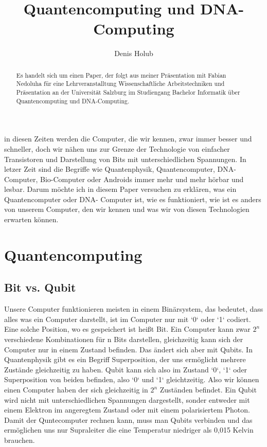 \documentclass{IEEEcsmag}
\begin{document}

\title{Quantencomputing und DNA-Computing}

\author{Denis Holub}



\begin{abstract}
Es handelt sich um einen Paper, der folgt aus meiner Präsentation mit Fabian Nedoluha für eine Lehrveranstalltung Wissenschaftliche Arbeitstechniken und Präsentation an der Universität Salzburg im Studiengang Bachelor Informatik über Quantencomputing und DNA-Computing. 
\end{abstract}

\maketitle


in diesen Zeiten werden die Computer, die wir kennen, zwar immer besser und schneller, doch wir nähen uns zur Grenze der Technologie von einfacher Transistoren und Darstellung von Bits mit unterschiedlichen Spannungen. In letzer Zeit sind die Begriffe wie Quantenphysik, Quantencomputer, DNA-Computer, Bio-Computer oder Androids immer mehr und mehr hörbar und lesbar. Darum möchte ich in diesem Paper versuchen zu erklären, was ein Quantencomputer oder DNA- Computer ist, wie es funktioniert, wie ist es anders von unserem Computer, den wir kennen und was wir von diesen Technologien erwarten können.


\section{Quantencomputing}

\subsection {Bit vs. Qubit}
Unsere Computer funktionieren meisten in einem Binärsystem, das bedeutet, dass alles was ein Computer darstellt, ist im Computer nur mit  `0` oder `1` codiert. Eine solche Position, wo es gespeichert ist heißt Bit. Ein Computer kann zwar $2^{n}$ verschiedene Kombinationen für n Bits darstellen, gleichzeitig kann sich der Computer nur in einem Zustand befinden. Das ändert sich aber mit Qubits. In Quantenphysik gibt es ein Begriff Superposition, der uns ermöglicht mehrere Zustände gleichzeitig zu haben. Qubit kann sich also im Zustand `0`, `1` oder Superposition von beiden befinden, also `0` und `1` gleichtzeitig. Also wir können einen Computer haben der sich gleichzeitig in  $2^{n}$ Zuständen befindet. Ein Qubit wird nicht mit unterschiedlichen Spannungen dargestellt, sonder entweder mit einem Elektron im angeregtem Zustand oder mit einem polarisiertem Photon. Damit der Quntecomputer rechnen kann, muss man Qubits verbinden und das ermöglichen uns nur Supraleiter die eine Temperatur niedriger als 0,015 Kelvin brauchen.
\end{document}
